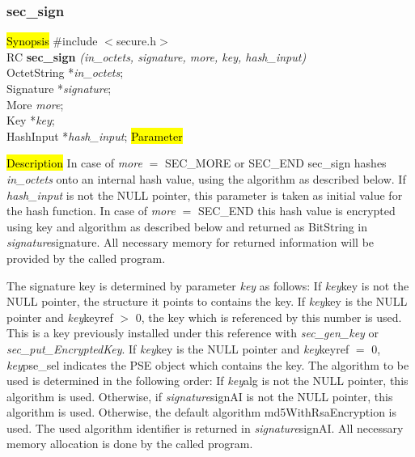 \subsubsection{sec\_sign}
\label{sec_sign}
\hl{Synopsis}
\#include $<$secure.h$>$ \\ [0.5cm]
RC {\bf sec\_sign} {\em (in\_octets, signature, more, key, hash\_input)} \\
OctetString *{\em in\_octets}; \\
Signature *{\em signature}; \\
More {\em more}; \\
Key *{\em key}; \\
HashInput *{\em hash\_input};
\hl{Parameter}





\hl{Description}
In case of {\em more} $=$ SEC\_MORE or SEC\_END sec\_sign hashes {\em in\_octets} onto
an internal hash value, using the algorithm as described below.
If {\em hash\_input} is not the NULL pointer, this parameter is taken
as initial value for the hash function.
In case of {\em more} $=$ SEC\_END this hash value is encrypted using key and
algorithm as described below and returned as BitString in {\em signature}\pf signature.
All necessary memory for returned information will be provided by the
called program. 

The signature key is determined by parameter {\em key} as follows:
\be
\m If {\em key}\pf key is not the NULL pointer, the structure it points to
   contains the key.
\m If {\em key}\pf key is the NULL pointer and {\em key}\pf keyref $>$ 0,
   the key which is referenced by this number is used. This is a key
   previously installed under this reference with {\em sec\_gen\_key} or 
   {\em sec\_put\_EncryptedKey}.
\m If {\em key}\pf key is the NULL pointer and {\em key}\pf keyref $=$ 0,
   {\em key}\pf pse\_sel indicates the PSE object which contains the key.
\ee
The algorithm to be used is determined in the following order:
\be
\m If {\em key}\pf alg is not the NULL pointer, this algorithm
   is used.
\m Otherwise, if {\em signature}\pf signAI is not the NULL pointer, this algorithm
   is used.
\m Otherwise, the default algorithm md5WithRsaEncryption is used.
\ee
   The used algorithm identifier 
   is returned in {\em signature}\pf signAI.
   All necessary memory allocation is done by the called program.

